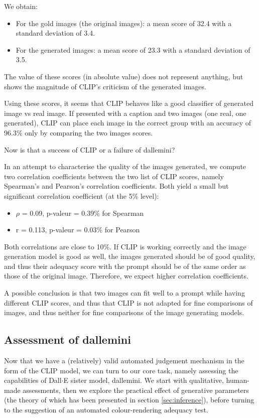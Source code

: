 \documentclass{article}
\begin{document}
\begin{multicols}{2}
We obtain:
\begin{itemize}
    \item For the gold images (the original images): a mean score of 32.4 with a standard deviation of 3.4.
    \item For the generated images: a mean score of 23.3 with a standard deviation of 3.5.
\end{itemize}

The value of these scores (in absolute value) does not represent anything, but shows the magnitude of CLIP's criticism of the generated images.

Using these scores, it seems that CLIP behaves like a good classifier of generated image vs real image. If presented with a caption and two images (one real, one generated), CLIP can place each image in the correct group with an accuracy of 96.3\% only by comparing the two images scores.

Now is that a success of CLIP or a failure of \gls{dallemini}?

In an attempt to characterise the quality of the images generated, we compute two correlation coefficients between the two list of CLIP scores, namely Spearman's and Pearson's correlation coefficients. Both yield a small but significant correlation coefficient (at the 5\% level):
\begin{itemize}
    \item $\rho$ = 0.09, p-valeur = 0.39\% for Spearman
    \item r = 0.113, p-valeur = 0.03\% for Pearson
\end{itemize}
Both correlations are close to 10\%. If CLIP is working correctly and the image generation model is good as well, the images generated should be of good quality, and thus their adequacy score with the prompt should be of the same order as those of the original image. Therefore, we expect higher correlation coefficients. 

A possible conclusion is that two images can fit well to a prompt while having different CLIP scores, and thus that CLIP is not adapted for fine comparisons of images, and thus neither for fine comparisons of the image generating models. 

\subsection{Assessment of \gls{dallemini}}

Now that we have a (relatively) valid automated judgement mechanism in the form of the CLIP model, we can turn to our core task, namely assessing the capabilities of Dall$\cdot$E sister model, \gls{dallemini}. We start with qualitative, human-made assessments, then we explore the practical effect of generative parameters (the theory of which has been presented in section \ref{sec:inference}), before turning to the suggestion of an automated colour-rendering adequacy test.


\end{multicols}
\end{document}

